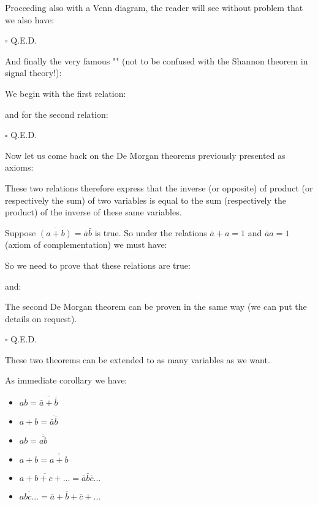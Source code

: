 \begin{dem}
	Proceeding also with a Venn diagram, the reader will see without problem that we also have:
	
	
	\begin{flushright}
		$\square$  Q.E.D.
	\end{flushright}
	\end{dem}
	\begin{theorem}
	And finally the very famous "" (not to be confused with the Shannon theorem in signal theory!):
	
	\end{theorem}
	\begin{dem}
	We begin with the first relation:
	
	and for the second relation:
	
	\begin{flushright}
		$\square$  Q.E.D.
	\end{flushright}
	\end{dem}
	\label{de morgan theorem}
	\begin{theorem}
	Now let us come back on the De Morgan theorems previously presented as axioms:
	
	These two relations therefore express that the inverse (or opposite) of  product (or respectively the sum) of two variables is equal to the sum (respectively the product) of the inverse of these same variables.
	\end{theorem}
	\begin{dem}
	Suppose $\overline{(a+b)}=\bar{a}\bar{b}$ is true. So under the relations $\bar{a}+a=1$ and $\bar{a}a=1$ (axiom of complementation) we must have:
	
	So we need to prove that these relations are true:
	
	and:
	
	The second De Morgan theorem can be proven in the same way (we can put the details on request).
	\begin{flushright}
		$\square$  Q.E.D.
	\end{flushright}
	\end{dem}
	\begin{tcolorbox}[title=Remark,colframe=black,arc=10pt]
	These two theorems can be extended to as many variables as we want.
	\end{tcolorbox}
	\begin{corollary}
	As immediate corollary we have:
	\begin{itemize}
		\item $ab=\overline{\bar{a}+\bar{b}}$
		\item $a+b=\overline{\bar{a}\bar{b}}$
		\item $ab=\overline{\overline{ab}}$
		\item $a+b=\overline{\overline{a+b}}$
		\item $\overline{a+b+c+...}=\bar{a}\bar{b}\bar{c}...$
		\item $\overline{abc...}=\bar{a}+\bar{b}+\bar{c}+...$
	\end{itemize}
	\end{corollary}
